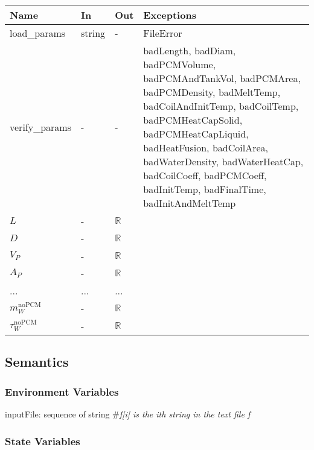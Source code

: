 \documentclass[12pt, titlepage]{article}
\begin{document}
\begin{tabular}{p{3cm} p{1cm} p{1cm} >{\raggedright\arraybackslash}p{9cm}}
\toprule
\textbf{Name} & \textbf{In} & \textbf{Out} & \textbf{Exceptions} \\
\midrule
load\_params & string & - &  FileError \\
verify\_params & - & - & badLength, badDiam, badPCMVolume, badPCMAndTankVol,
                        badPCMArea, badPCMDensity, badMeltTemp,
                        badCoilAndInitTemp, badCoilTemp, badPCMHeatCapSolid,
                        badPCMHeatCapLiquid, badHeatFusion, badCoilArea,
                        badWaterDensity, badWaterHeatCap, badCoilCoeff,
                        badPCMCoeff, badInitTemp, badFinalTime,
                        badInitAndMeltTemp \\
$L$ & - & $\mathbb{R}$\\
$D$ & - & $\mathbb{R}$\\
$V_P$ & - & $\mathbb{R}$\\
$A_P$ & - & $\mathbb{R}$\\
... & ... & ...\\
$m_W^{\text{noPCM}}$ & - & $\mathbb{R}$ \\
$\tau_W^{\text{noPCM}}$ & - & $\mathbb{R}$\\
\bottomrule
\end{tabular}

\subsection{Semantics}

\subsubsection{Environment Variables}

inputFile: sequence of string \#\textit{f[i] is the ith string in the text file f}\\ 

\subsubsection{State Variables}
\end{document}

